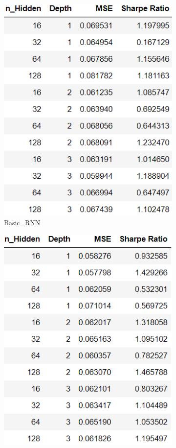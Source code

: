 \documentclass[11pt, letterpaper, headings=standardclasses]{scrartcl}
\begin{document}
	\begin{figure}[H]
    \centering
        \begin{subfigure}{.33\textwidth}
      \centering
      \includegraphics[width=.9\linewidth]{RNN.png}
      \caption{Basic\_RNN}
      \label{fig:sub1}
    \end{subfigure}%
    \begin{subfigure}{.33\textwidth}
      \centering
      \includegraphics[width=.9\linewidth]{GRU.png}

\end{subfigure}
\end{figure}
\end{document}
